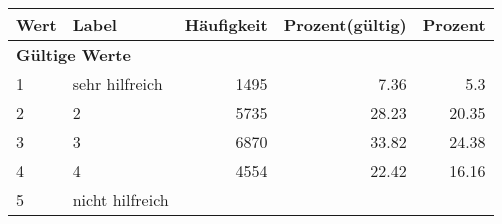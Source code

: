      \begin{longtable}{lXrrr}
     \toprule
     \textbf{Wert} & \textbf{Label} & \textbf{Häufigkeit} & \textbf{Prozent(gültig)} & \textbf{Prozent} \\
     \endhead
     \midrule
     \multicolumn{5}{l}{\textbf{Gültige Werte}}\\

     1 &
     \multicolumn{1}{X}{ sehr hilfreich   } &


       \num{1495} &
       \num[round-mode=places,round-precision=2]{7.36} &
         \num[round-mode=places,round-precision=2]{5.3} \\

     2 &
     \multicolumn{1}{X}{ 2   } &


       \num{5735} &
       \num[round-mode=places,round-precision=2]{28.23} &
         \num[round-mode=places,round-precision=2]{20.35} \\

     3 &
     \multicolumn{1}{X}{ 3   } &


       \num{6870} &
       \num[round-mode=places,round-precision=2]{33.82} &
         \num[round-mode=places,round-precision=2]{24.38} \\

     4 &
     \multicolumn{1}{X}{ 4   } &


       \num{4554} &
       \num[round-mode=places,round-precision=2]{22.42} &
         \num[round-mode=places,round-precision=2]{16.16} \\

     5 &
     \multicolumn{1}{X}{ nicht hilfreich   } &



\end{longtable}
